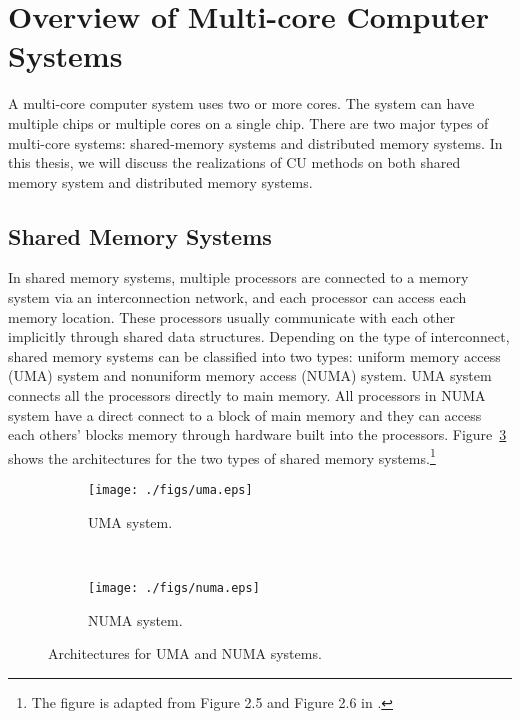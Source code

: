 \section{Overview of Multi-core Computer Systems}
A multi-core computer system uses two or more cores. The system can have multiple chips or multiple cores on a single chip. There are two major types of multi-core systems: shared-memory systems and distributed memory systems. In this thesis, we will discuss the realizations of CU methods on both shared memory system and distributed memory systems. 

\subsection{Shared Memory Systems}
In shared memory systems, multiple processors are connected to a memory system via an interconnection network, and each processor can access each memory location. These processors usually communicate with each other implicitly through shared data structures. Depending on the type of interconnect, shared memory systems can be classified into two types: uniform memory access (UMA) system and nonuniform memory access (NUMA) system. UMA system connects all the processors directly to main memory. All processors in NUMA system have a direct connect to a block of main memory and they can access each others' blocks memory through hardware built into the processors. Figure~\ref{fig:shared_mem} shows the architectures for the two types of shared memory systems.\footnote{The figure is adapted from Figure 2.5 and Figure 2.6 in \cite{pacheco2011introduction}.} 
\begin{figure}[!h]
        \centering
       \begin{subfigure}[b]{0.45\textwidth}
                \texttt{[image: ./figs/uma.eps]}
                \caption{UMA system.}\label{fig:consist}
        \end{subfigure}
        ~ %
        \begin{subfigure}[b]{0.45\textwidth}
                \texttt{[image: ./figs/numa.eps]}
                \caption{NUMA system.}\label{fig:inconsist}
        \end{subfigure}
        \vspace{-3mm}
        \caption{Architectures for UMA and NUMA systems.}
        \vspace{-3mm}
        \label{fig:shared_mem}
\end{figure}


